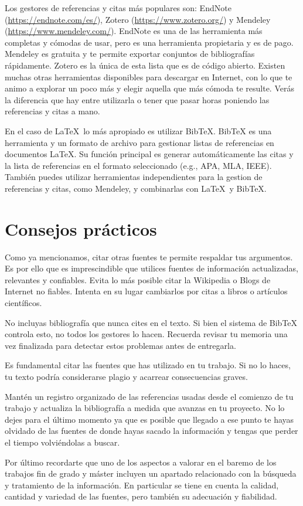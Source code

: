 Los gestores de referencias y citas más populares son: EndNote (\url{https://endnote.com/es/}), Zotero (\url{https://www.zotero.org/}) y Mendeley (\url{https://www.mendeley.com/}). EndNote es una de las herramienta más completas y cómodas de usar, pero es una herramienta propietaria y es de pago. Mendeley es gratuita y te permite exportar conjuntos de bibliografías rápidamente. Zotero es la única de esta lista que es de código abierto. Existen muchas otras herramientas disponibles para descargar en Internet, con lo que te animo a explorar un poco más y elegir aquella que más cómoda te resulte. Verás la diferencia que hay entre utilizarla o tener que pasar horas poniendo las referencias y citas a mano.

En el caso de \LaTeX\ lo más apropiado es utilizar BibTeX. BibTeX es una herramienta y un formato de archivo para gestionar listas de referencias en documentos \LaTeX. Su función principal es generar automáticamente las citas y la lista de referencias en el formato seleccionado (e.g., APA, MLA, IEEE). También puedes utilizar herramientas independientes para la gestion de referencias y citas, como Mendeley, y combinarlas con \LaTeX\ y BibTeX.

\section{Consejos prácticos}

Como ya mencionamos, citar otras fuentes te permite respaldar tus argumentos. Es por ello que es imprescindible que utilices fuentes de información actualizadas, relevantes y confiables. Evita lo más posible citar la Wikipedia o Blogs de Internet no fiables. Intenta en su lugar cambiarlos por citas a libros o artículos científicos.


No incluyas bibliografía que nunca cites en el texto. Si bien el sistema de BibTeX controla esto, no todos los gestores lo hacen. Recuerda revisar tu memoria una vez finalizada para detectar estos problemas antes de entregarla.

Es fundamental citar las fuentes que has utilizado en tu trabajo. Si no lo haces, tu texto podría considerarse plagio y acarrear consecuencias graves.

Mantén un registro organizado de las referencias usadas desde el comienzo de tu trabajo y actualiza la bibliografía a medida que avanzas en tu proyecto. No lo dejes para el último momento ya que es posible que llegado a ese punto te hayas olvidado de las fuentes de donde hayas sacado la información y tengas que perder el tiempo volviéndolas a buscar.

Por último recordarte que uno de los aspectos a valorar en el baremo de los trabajos fin de grado y máster incluyen un apartado relacionado con la búsqueda y tratamiento de la información. En particular se tiene en cuenta la calidad, cantidad y variedad de las fuentes, pero también su adecuación y fiabilidad. 
